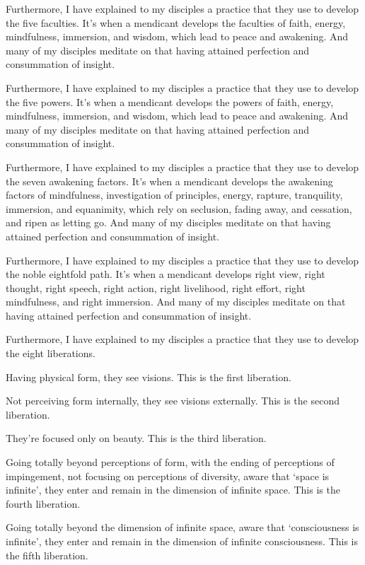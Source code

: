 \documentclass[12pt,openany]{book}%
\begin{document}
Furthermore, I have explained to my disciples a practice that they use to develop the five faculties. It’s when a mendicant develops the faculties of faith, energy, mindfulness, immersion, and wisdom, which lead to peace and awakening. And many of my disciples meditate on that having attained perfection and consummation of insight. 

Furthermore, I have explained to my disciples a practice that they use to develop the five powers. It’s when a mendicant develops the powers of faith, energy, mindfulness, immersion, and wisdom, which lead to peace and awakening. And many of my disciples meditate on that having attained perfection and consummation of insight. 

Furthermore, I have explained to my disciples a practice that they use to develop the seven awakening factors. It’s when a mendicant develops the awakening factors of mindfulness, investigation of principles, energy, rapture, tranquility, immersion, and equanimity, which rely on seclusion, fading away, and cessation, and ripen as letting go. And many of my disciples meditate on that having attained perfection and consummation of insight. 

Furthermore, I have explained to my disciples a practice that they use to develop the noble eightfold path. It’s when a mendicant develops right view, right thought, right speech, right action, right livelihood, right effort, right mindfulness, and right immersion. And many of my disciples meditate on that having attained perfection and consummation of insight. 

Furthermore, I have explained to my disciples a practice that they use to develop the eight liberations. 

Having physical form, they see visions. This is the first liberation. 

Not perceiving form internally, they see visions externally. This is the second liberation. 

They’re focused only on beauty. This is the third liberation. 

Going totally beyond perceptions of form, with the ending of perceptions of impingement, not focusing on perceptions of diversity, aware that ‘space is infinite’, they enter and remain in the dimension of infinite space. This is the fourth liberation. 

Going totally beyond the dimension of infinite space, aware that ‘consciousness is infinite’, they enter and remain in the dimension of infinite consciousness. This is the fifth liberation. 
\end{document}
